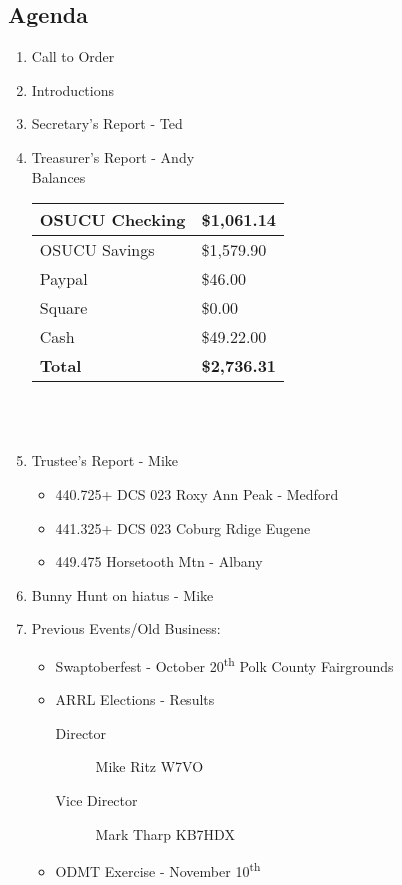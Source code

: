 \documentclass[letter,11pt]{extarticle}
\begin{document}
	\subsection*{Agenda}
	\begin{enumerate}
		\item Call to Order
		\item Introductions
		\item Secretary's Report - Ted
		\item Treasurer's Report - Andy \\
				Balances 
			\begin{tabular}{|l|l|} \hline
				OSUCU Checking & \$1,061.14 \\ \hline
				OSUCU Savings & \$1,579.90 \\ \hline
				Paypal & \$46.00 \\ \hline
				Square & \$0.00 \\ \hline
				Cash & \$49.22.00 \\ \hline
				\textbf{Total} & \textbf{\$2,736.31} \\ \hline
			\end{tabular} \\ \\
		\item Trustee's Report - Mike
			\begin{itemize}
				\item 440.725+ DCS 023 Roxy Ann Peak - Medford
				\item 441.325+ DCS 023 Coburg Rdige Eugene
				\item 449.475 Horsetooth Mtn - Albany
			\end{itemize}
		\item Bunny Hunt on hiatus - Mike
		\item Previous Events/Old Business:
		\begin{itemize}
			\item Swaptoberfest - October 20\textsuperscript{th} Polk County Fairgrounds
			\item ARRL Elections - Results
				\begin{description}
					\item[Director] Mike Ritz W7VO
					\item[Vice Director] Mark Tharp KB7HDX
				\end{description}
			\item ODMT Exercise - November 10\textsuperscript{th}
		\end{itemize}
			

\end{enumerate}
\end{document}
